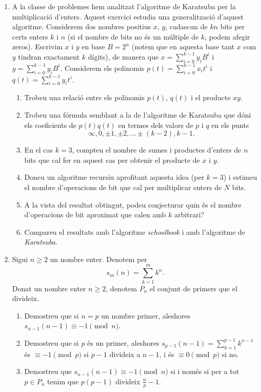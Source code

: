 \begin{enumerate}[leftmargin=*]
\begin{enumerate}
\end{enumerate}


\item  A la classe de problemes hem analitzat l'algoritme de
Karatsuba per la multiplicació d'enters. Aquest exercici estudia una
generalització d'aquest algoritme. Considerem dos nombres positius
$x$, $y$, cadascun de $kn$ bits per certs enters $k$ i $n$ (si el
nombre de bits no és un múltiple de $k$, podem afegir zeros).
Escrivim $x$ i $y$ en base $B = 2^n$ (notem que en aquesta base tant
$x$ com $y$ tindran exactament $k$ dígits), de manera que
$x=\sum_{i=0}^{k-1} y_i B^i$ i $y=\sum_{i=0}^{k-1} y_iB^i$.
Considerem els polinomis $p(t)=\sum_{i=0}^{k-1}x_it^i$ i
$q(t)=\sum_{i=0}^{k-1}y_it^i$.
  \begin{enumerate}
  \item Trobeu una relació entre els polinomis $p(t)$, $q(t)$ i el producte $xy$.
  \item Trobeu una fórmula semblant a la de l'algoritme de Karatsuba que dóni els coeficients de $p(t)q(t)$ en termes dels valors de $p$ i $q$ en els punts
    \[
      \infty, 0, \pm 1, \pm 2,\ldots \pm (k-2), k-1.
    \]
  \item En el cas $k=3$, compteu el nombre de sumes i productes d'enters de $n$ bits que cal fer en aquest cas per obtenir el producte de $x$ i $y$.
  \item Doneu un algoritme recursiu aprofitant aquesta idea (per $k=3$) i estimeu el nombre d'operacions de bit que cal per multiplicar enters de $N$ bits.
  \item A la vista del resultat obtingut, podeu conjecturar quin és el nombre d'operacions de bit aproximat que calen amb $k$ arbitrari?
  \item Compareu el resultats amb l'algoritme \emph{schoolbook} i amb l'algoritme de \emph{Karatsuba}.
  \end{enumerate}

\item  Sigui $n\ge 2$ un nombre enter. Denotem per
$$s_m(n)=\sum_{k=1}^{m} k^{n}.$$ Donat un nombre enter
$n\ge 2$, denotem $P_n$ el conjunt de primers que el divideix.
\begin{enumerate}
\item Demostreu que si $n=p$ un nombre primer, aleshores $s_{n-1}(n-1)\equiv
-1 \pmod{n}$.
\item Demostreu que si $p$ és un primer, aleshores $s_{p-1}(n-1)=\sum_{k=1}^{p-1}
k^{n-1}$ és $\equiv -1\pmod{p}$ si $p-1$ divideix a $n-1$, i és
$\equiv 0\pmod{p}$ si no.
\item Demostreu que $s_{n-1}(n-1)\equiv -1 \pmod{n}$ si i només si per a tot
$p\in P_n$ tenim que $p(p-1)$ divideix $\frac np -1$. 


\end{enumerate}
\end{enumerate}
